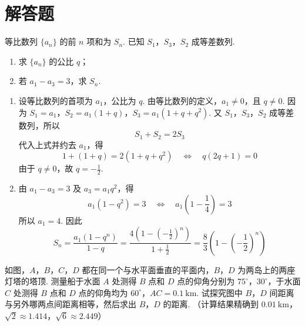 \section{解答题}

\begin{problem}
等比数列 \(\{a_{n}\}\) 的前 \(n\) 项和为 \(S_{n}\). 已知 \(S_{1}\)，\(S_{3}\)，\(S_{2}\) 成等差数列.
\begin{enumerate}
\item 求 \(\{a_{n}\}\) 的公比 \(q\)；
\item 若 \(a_{1} - a_{3} = 3\)，求 \(S_{n}\).
\end{enumerate}
\end{problem}

\begin{solution}
\begin{enumerate}
\item
设等比数列的首项为 \(a_{1}\)，公比为 \(q\). 由等比数列的定义，\(a_{1}\neq 0\)，且 \(q\neq 0\). 因为
\(S_{1}=a_{1}\)，\(S_{2}=a_{1}(1+q)\)，\(S_{3}=a_{1}(1+q+q^{2})\).
又 \(S_{1}\)，\(S_{3}\)，\(S_{2}\) 成等差数列，所以
\[
S_{1}+S_{2}=2S_{3}
\]
代入上式并约去 \(a_{1}\)，得
\[
1+(1+q)=2(1+q+q^{2})
\quad\Longleftrightarrow\quad
q(2q+1)=0
\]
由于 \(q\neq0\)，故 \(q=-\frac{1}{2}\).

\item
由 \(a_{1}-a_{3}=3\) 及 \(a_{3}=a_{1}q^{2}\)，得
\[
a_{1}\left(1-q^{2}\right)=3
\quad\Longleftrightarrow\quad
a_{1}\left(1-\frac14\right)=3
\]
所以 \(a_{1}=4\). 因此
\[
S_{n}=\frac{a_{1}(1-q^{n})}{1-q}
    =\frac{4\left(1-\left(-\frac12\right)^{n}\right)}{1+\frac12}
    =\frac{8}{3}\left(1-\left(-\frac12\right)^{n}\right)
\]
\end{enumerate}
\end{solution}

\begin{problem}
如图，\(A\)，\(B\)，\(C\)，\(D\) 都在同一个与水平面垂直的平面内，\(B\)，\(D\) 为两岛上的两座灯塔的塔顶. 测量船于水面 \(A\) 处测得 \(B\) 点和 \(D\) 点的仰角分别为 \(75^{\circ}\)，\(30^{\circ}\)，于水面 \(C\) 处测得 \(B\) 点和 \(D\) 点的仰角均为 \(60^{\circ}\)，\(AC = 0.1 \mathrm{~km}\). 试探究图中 \(B\)，\(D\) 间距离与另外哪两点间距离相等，然后求出 \(B\)，\(D\) 的距离. （计算结果精确到 \(0.01 \mathrm{~km}\)，\(\sqrt{2} \approx 1.414\)，\(\sqrt{6} \approx 2.449\)）

\end{problem}

